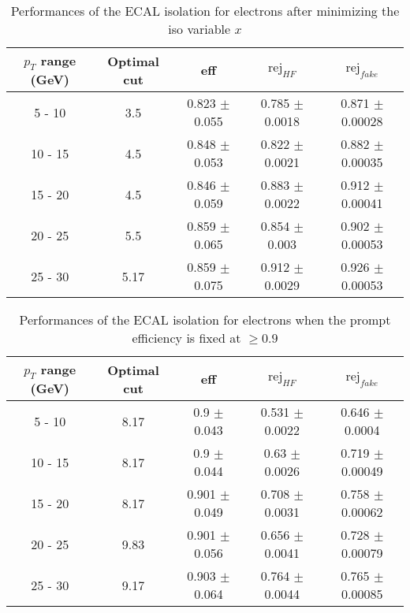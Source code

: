 \begin{table}[htbp]
   \centering
   \begin{tabular}{|c|c|c|c|c|}
      \hline
      $p_T$ range (GeV) & Optimal cut & eff & $\textrm{rej}_{HF}$ & $\textrm{rej}_{fake}$ \\
      \hline
      5 - 10 & 3.5 & 0.823 $\pm$ 0.055 & 0.785 $\pm$ 0.0018 & 0.871 $\pm$ 0.00028 \\
      \hline
      10 - 15 & 4.5 & 0.848 $\pm$ 0.053 & 0.822 $\pm$ 0.0021 & 0.882 $\pm$ 0.00035 \\
      \hline
      15 - 20 & 4.5 & 0.846 $\pm$ 0.059 & 0.883 $\pm$ 0.0022 & 0.912 $\pm$ 0.00041 \\
      \hline
      20 - 25 & 5.5 & 0.859 $\pm$ 0.065 & 0.854 $\pm$ 0.003 & 0.902 $\pm$ 0.00053 \\
      \hline
      25 - 30 & 5.17 & 0.859 $\pm$ 0.075 & 0.912 $\pm$ 0.0029 & 0.926 $\pm$ 0.00053 \\
      \hline
   \end{tabular}
   \caption{\small{Performances of the ECAL isolation for electrons after minimizing the iso variable $x$}\label{tab:ecal_elec_opt}}
\end{table}






\begin{table}[htbp]
   \centering
   \begin{tabular}{|c|c|c|c|c|}
      \hline
      $p_T$ range (GeV) & Optimal cut & eff & $\textrm{rej}_{HF}$ & $\textrm{rej}_{fake}$ \\
      \hline
      5 - 10 & 8.17 & 0.9 $\pm$ 0.043 & 0.531 $\pm$ 0.0022 & 0.646 $\pm$ 0.0004 \\
      \hline
      10 - 15 & 8.17 & 0.9 $\pm$ 0.044 & 0.63 $\pm$ 0.0026 & 0.719 $\pm$ 0.00049 \\
      \hline
      15 - 20 & 8.17 & 0.901 $\pm$ 0.049 & 0.708 $\pm$ 0.0031 & 0.758 $\pm$ 0.00062 \\
      \hline
      20 - 25 & 9.83 & 0.901 $\pm$ 0.056 & 0.656 $\pm$ 0.0041 & 0.728 $\pm$ 0.00079 \\
      \hline
      25 - 30 & 9.17 & 0.903 $\pm$ 0.064 & 0.764 $\pm$ 0.0044 & 0.765 $\pm$ 0.00085 \\
      \hline
   \end{tabular}
   \caption{\small{Performances of the ECAL isolation for electrons when the prompt efficiency is fixed at $\geq 0.9$}\label{tab:ecal_elec_eff}}
\end{table}






